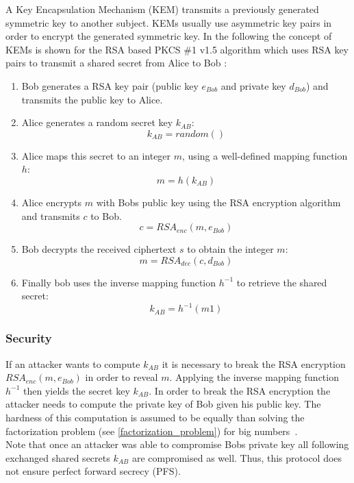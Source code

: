 A Key Encapsulation Mechanism (KEM) transmits a previously generated symmetric key to another subject. KEMs usually use asymmetric key pairs in order to encrypt the generated symmetric key. In the following the concept of KEMs is shown for the RSA based PKCS \#1 v1.5 algorithm which uses RSA key pairs to transmit a shared secret from Alice to Bob \parencite{rsakem}:

\begin{enumerate}
\item Bob generates a RSA key pair (public key $e_{Bob}$ and private key $d_{Bob}$) and transmits the public key to Alice.
\item Alice generates a random secret key $k_{AB}$:
\begin{equation*}
k_{AB} = random()
\end{equation*}
\item Alice maps this secret to an integer $m$, using a well-defined mapping function $h$:
\begin{equation*}
m = h(k_{AB})
\end{equation*}
\item Alice encrypts $m$ with Bobs public key using the RSA encryption algorithm and transmits $c$ to Bob.
\begin{equation*}
c = RSA_{enc}(m, e_{Bob})
\end{equation*}
\item Bob decrypts the received ciphertext $s$ to obtain the integer $m$:
\begin{equation*}
m = RSA_{dec}(c, d_{Bob})
\end{equation*}
\item Finally bob uses the inverse mapping function $h^{-1}$ to retrieve the shared secret:
\begin{equation*}
k_{AB} = h^{-1}(m1)
\end{equation*}

\end{enumerate}

\subsubsection{Security}
If an attacker wants to compute $k_{AB}$ it is necessary to break the RSA encryption $RSA_{enc}(m, e_{Bob})$ in order to reveal $m$. Applying the inverse mapping function $h^{-1}$ then yields the secret key $k_{AB}$. In order to break the RSA encryption the attacker needs to compute the private key of Bob given his public key. The hardness of this computation is assumed to be equally than solving the factorization problem (see \autoref{factorization_problem}) for big numbers~\parencite{rsa2005problem}.\\
Note that once an attacker was able to compromise Bobs private key all following exchanged shared secrets $k_{AB}$ are compromised as well. Thus, this protocol does not ensure perfect forward secrecy (PFS).

